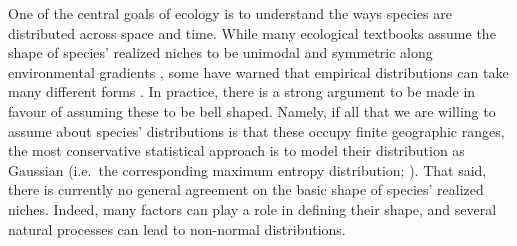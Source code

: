 \documentclass[11pt, a4paper]{article}
\begin{document}
One of the central goals of ecology is to understand the ways species are distributed across space and time. While many ecological textbooks assume the shape of species' realized niches to be unimodal and symmetric along environmental gradients \citep{krebsEcologyExperimentalAnalysis1972}, some have warned that empirical distributions can take many different forms \citep{austinModelsAnalysisSpecies1987, austinSpatialPredictionSpecies2002, sagarinMovingAssumptionsUnderstand2006}. In practice, there is a strong argument to be made in favour of assuming these to be bell shaped. Namely, if all that we are willing to assume about species' distributions is that these occupy finite geographic ranges, the most conservative statistical approach is to model their distribution as Gaussian (i.e.~the corresponding maximum entropy distribution; \citealt{frankCommonPatternsNature2009}). That said, there is currently no general agreement on the basic shape of species' realized niches. Indeed, many factors can play a role in defining their shape, and several natural processes can lead to non-normal distributions.

\end{document}
